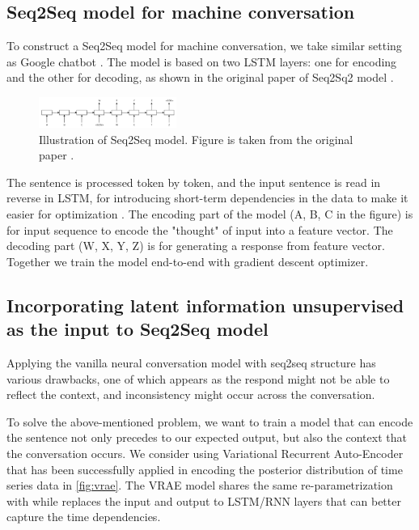 \subsection{Seq2Seq model for machine conversation}
To construct a Seq2Seq model for machine conversation, we take similar setting as Google chatbot \cite{ncm}. The model is based on two LSTM layers: one for encoding and the other for decoding, as shown in the original paper of Seq2Sq2 model \cite{seq2seqO}. 

\begin{figure}[H]
\includegraphics[width=0.4\textwidth]{seq2seq.png}
\caption{Illustration of Seq2Seq model. Figure is taken from the original paper \cite{seq2seqO}.}
\label{fig:seq2seq}
\end{figure}

The sentence is processed token by token, and the input sentence is read in reverse in LSTM, for introducing short-term dependencies in the data to make it easier for optimization \cite{seq2seqO}. The encoding part of the model (A, B, C in the figure) is for input sequence to encode the "thought" of input into a feature vector. The decoding part (W, X, Y, Z) is for generating a response from feature vector. Together we train the model end-to-end with gradient descent optimizer.

\subsection{Incorporating latent information unsupervised as the input to Seq2Seq model}
Applying the vanilla neural conversation model with seq2seq structure has various drawbacks, one of which appears as the respond might not be able to reflect the context, and inconsistency might occur across the conversation.

To solve the above-mentioned problem, we want to train a model that can encode the sentence not only precedes to our expected output, but also the context that the conversation occurs. We consider using Variational Recurrent Auto-Encoder \cite{vrae} that has been successfully applied in encoding the posterior distribution of time series data in \ref{fig:vrae}. The VRAE model shares the same re-parametrization with \cite{vae} while replaces the input and output to LSTM/RNN layers that can better capture the time dependencies.

